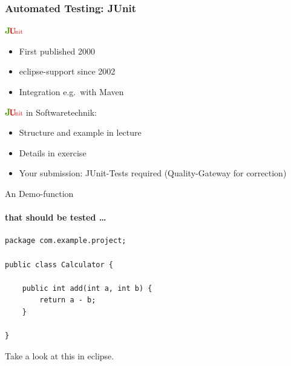 
\begin{frame}
 \frametitle{Automated Testing: JUnit}
 
 \includegraphics[width=0.8cm]{images/Konfigurationsmanagement/abbildungen/junit.png}
\begin{itemize}
   \item First published 2000
   \item eclipse-support since 2002
   \item Integration e.g.~with Maven
\end{itemize}
\pause
 
\includegraphics[width=0.8cm]{images/Konfigurationsmanagement/abbildungen/junit.png} in Softwaretechnik:
\begin{itemize}
   \item Structure and example in lecture
   \item Details in exercise
   \item Your submission: JUnit-Tests required (Quality-Gateway for correction)
\end{itemize}
\end{frame}


\begin{frame}[containsverbatim]{An Demo-function}
\framesubtitle{that should be tested \dots}
\lstset{language=Java}
\begin{lstlisting}[frame=single]
package com.example.project;

public class Calculator {

	public int add(int a, int b) {
		return a - b;
	}

}
\end{lstlisting}
\begin{flushright}
Take a look at this in eclipse.
\end{flushright}
\end{frame}


